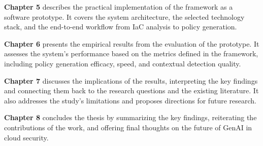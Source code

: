 \textbf{Chapter 5} describes the practical implementation of the framework as a software prototype. It covers the system architecture, the selected technology stack, and the end-to-end workflow from IaC analysis to policy generation.

\textbf{Chapter 6} presents the empirical results from the evaluation of the prototype. It assesses the system's performance based on the metrics defined in the framework, including policy generation efficacy, speed, and contextual detection quality.

\textbf{Chapter 7} discusses the implications of the results, interpreting the key findings and connecting them back to the research questions and the existing literature. It also addresses the study's limitations and proposes directions for future research.

\textbf{Chapter 8} concludes the thesis by summarizing the key findings, reiterating the contributions of the work, and offering final thoughts on the future of GenAI in cloud security.